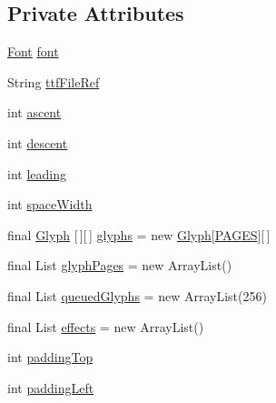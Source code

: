 \subsection*{Private Attributes}
\begin{DoxyCompactItemize}
\item 
\mbox{\hyperlink{interfaceorg_1_1newdawn_1_1slick_1_1_font}{Font}} \mbox{\hyperlink{classorg_1_1newdawn_1_1slick_1_1_unicode_font_a956ab491839be375d47444a67ebff11c}{font}}
\item 
String \mbox{\hyperlink{classorg_1_1newdawn_1_1slick_1_1_unicode_font_a2f13dde71bdabcab77c49030a4af17f2}{ttf\+File\+Ref}}
\item 
int \mbox{\hyperlink{classorg_1_1newdawn_1_1slick_1_1_unicode_font_a195706fa1491e793a4b923dd844b594f}{ascent}}
\item 
int \mbox{\hyperlink{classorg_1_1newdawn_1_1slick_1_1_unicode_font_a950be0068111dc978c95345cc6cadddf}{descent}}
\item 
int \mbox{\hyperlink{classorg_1_1newdawn_1_1slick_1_1_unicode_font_a2288222beb428489eccae8d71f278e37}{leading}}
\item 
int \mbox{\hyperlink{classorg_1_1newdawn_1_1slick_1_1_unicode_font_a0a5c4d3ca783d30c87d5434c1c50b8f3}{space\+Width}}
\item 
final \mbox{\hyperlink{classorg_1_1newdawn_1_1slick_1_1font_1_1_glyph}{Glyph}} \mbox{[}$\,$\mbox{]}\mbox{[}$\,$\mbox{]} \mbox{\hyperlink{classorg_1_1newdawn_1_1slick_1_1_unicode_font_a7c13214f4b7f734a81731b1d4e82449a}{glyphs}} = new \mbox{\hyperlink{classorg_1_1newdawn_1_1slick_1_1font_1_1_glyph}{Glyph}}\mbox{[}\mbox{\hyperlink{classorg_1_1newdawn_1_1slick_1_1_unicode_font_a2f1bf2ab8649b6db562d35e9c2fa1bcd}{P\+A\+G\+ES}}\mbox{]}\mbox{[}$\,$\mbox{]}
\item 
final List \mbox{\hyperlink{classorg_1_1newdawn_1_1slick_1_1_unicode_font_aa371c2e8adc81e8186fa3ef74c6f6a59}{glyph\+Pages}} = new Array\+List()
\item 
final List \mbox{\hyperlink{classorg_1_1newdawn_1_1slick_1_1_unicode_font_a38f7c7922eba8b5188d7b098b2c1d97f}{queued\+Glyphs}} = new Array\+List(256)
\item 
final List \mbox{\hyperlink{classorg_1_1newdawn_1_1slick_1_1_unicode_font_a57bc565e86127d8f7c0d7bcfa2f6dc56}{effects}} = new Array\+List()
\item 
int \mbox{\hyperlink{classorg_1_1newdawn_1_1slick_1_1_unicode_font_acadcc8c595615d077e2c0039818292f2}{padding\+Top}}
\item 
int \mbox{\hyperlink{classorg_1_1newdawn_1_1slick_1_1_unicode_font_a2c0919e4c3c800093767e29827064b0e}{padding\+Left}}

\end{DoxyCompactItemize}
